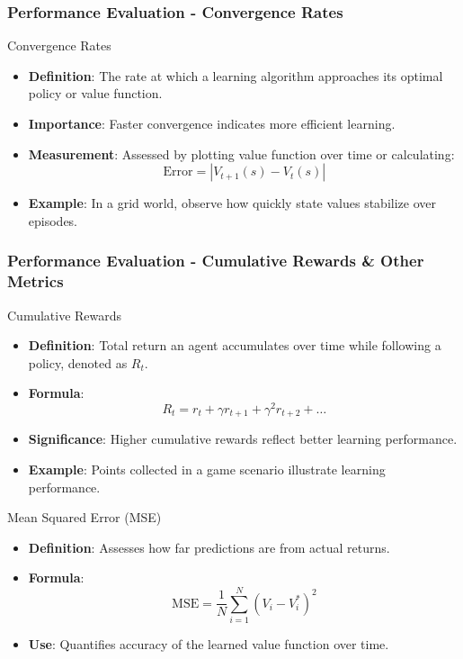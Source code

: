 \documentclass[aspectratio=169]{beamer}
\begin{document}
\begin{frame}[fragile]
    \frametitle{Performance Evaluation - Convergence Rates}
    \begin{block}{Convergence Rates}
        \begin{itemize}
            \item \textbf{Definition}: The rate at which a learning algorithm approaches its optimal policy or value function.
            \item \textbf{Importance}: Faster convergence indicates more efficient learning.
            \item \textbf{Measurement}: Assessed by plotting value function over time or calculating:
            \begin{equation}
                \text{Error} = |V_{t+1}(s) - V_t(s)|
            \end{equation}
            \item \textbf{Example}: In a grid world, observe how quickly state values stabilize over episodes.
        \end{itemize}
    \end{block}
\end{frame}

\begin{frame}[fragile]
    \frametitle{Performance Evaluation - Cumulative Rewards & Other Metrics}
    \begin{block}{Cumulative Rewards}
        \begin{itemize}
            \item \textbf{Definition}: Total return an agent accumulates over time while following a policy, denoted as \( R_t \).
            \item \textbf{Formula}:
            \begin{equation}
                R_t = r_t + \gamma r_{t+1} + \gamma^2r_{t+2} + \ldots
            \end{equation}
            \item \textbf{Significance}: Higher cumulative rewards reflect better learning performance.
            \item \textbf{Example}: Points collected in a game scenario illustrate learning performance.
        \end{itemize}
    \end{block}

    \begin{block}{Mean Squared Error (MSE)}
        \begin{itemize}
            \item \textbf{Definition}: Assesses how far predictions are from actual returns.
            \item \textbf{Formula}:
            \begin{equation}
                \text{MSE} = \frac{1}{N} \sum_{i=1}^{N} (V_i - V^*_i)^2
            \end{equation}
            \item \textbf{Use}: Quantifies accuracy of the learned value function over time.
        \end{itemize}
    \end{block}
\end{frame}
\end{document}
